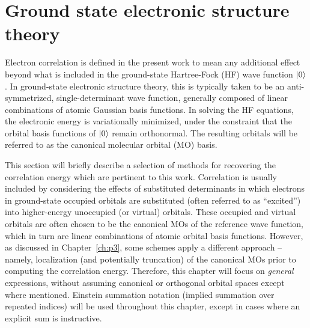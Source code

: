 \section{Ground state electronic structure theory} \label{se:est}
Electron correlation is defined in the present work to mean any additional
effect beyond what is included in the ground-state Hartree-Fock (HF)
wave function $| 0 \rangle$. In ground-state electronic structure theory,
this is typically taken to be an anti-symmetrized, single-determinant wave
function, generally composed of linear combinations of atomic Gaussian
basis functions. In solving the HF equations, the electronic energy
is variationally minimized, under the constraint that the orbital basis
functions of $| 0 \rangle$ remain orthonormal.\cite{Szabo1996} The resulting
orbitals will be referred to as the canonical molecular orbital (MO) basis.

This section will briefly describe a selection of methods for recovering
the correlation energy which are pertinent to this work. Correlation is
usually included by considering the effects of substituted determinants in
which electrons in ground-state occupied orbitals are substituted (often
referred to as ``excited'') into higher-energy unoccupied (or virtual)
orbitals. These occupied and virtual orbitals are often chosen to be the
canonical MOs of the reference wave function, which in turn are linear
combinations of atomic orbital basis functions. However, as discussed in
Chapter~\ref{ch:p3}, some schemes apply a different approach -- namely, localization
(and potentially truncation) of the canonical MOs prior to computing the
correlation energy. Therefore, this chapter will focus on \textit{general}
expressions, without assuming canonical or orthogonal orbital spaces
except where mentioned. Einstein summation notation (implied summation
over repeated indices) will be used throughout this chapter, except in
cases where an explicit sum is instructive.

